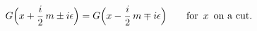\begin{equation}
  \label{eq:rs}
G\Big(x+\frac i2 \,m \pm i\epsilon\Big)=
G\Big(x-\frac i2 \,m \mp i\epsilon\Big)\qquad {\rm for}
\ \, x \ \, {\rm on\  a\ cut.}
\end{equation}

